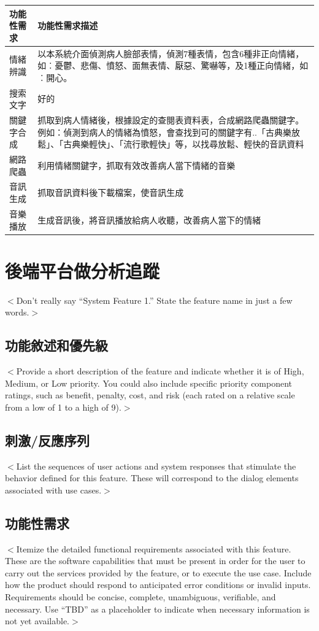 \documentclass[12pt]{scrreprt}
\begin{document}
\begin{center}  
\begin{tabular}{|l| p{10cm}|}  
\hline  
功能性需求 & 功能性需求描述   \\ \hline  
情緒辨識 &以本系統介面偵測病人臉部表情，偵測7種表情，包含6種非正向情緒，如︰憂鬱、悲傷、憤怒、面無表情、厭惡、驚嚇等，及1種正向情緒，如︰開心。    \\ \hline  
搜索文字& 好的\\\hline
關鍵字合成 & 抓取到病人情緒後，根據設定的查閱表資料表，合成網路爬蟲關鍵字。例如：偵測到病人的情緒為憤怒，會查找到可的關鍵字有..「古典樂放鬆」、「古典樂輕快」、「流行歌輕快」等，以找尋放鬆、輕快的音訊資料    \\ \hline  
網路爬蟲 & 利用情緒關鍵字，抓取有效改善病人當下情緒的音樂 \\ \hline
音訊生成 & 抓取音訊資料後下載檔案，使音訊生成 \\ \hline
音樂播放 & 生成音訊後，將音訊播放給病人收聽，改善病人當下的情緒 \\ \hline

\end{tabular}  
\end{center}  


\section{後端平台做分析追蹤}
$<$Don’t really say “System Feature 1.” State the feature name in just a few 
words.$>$

\subsection{功能敘述和優先級}
$<$Provide a short description of the feature and indicate whether it is of 
High, Medium, or Low priority. You could also include specific priority 
component ratings, such as benefit, penalty, cost, and risk (each rated on a 
relative scale from a low of 1 to a high of 9).$>$

\subsection{刺激/反應序列}
$<$List the sequences of user actions and system responses that stimulate the 
behavior defined for this feature. These will correspond to the dialog elements 
associated with use cases.$>$

\subsection{功能性需求}
$<$Itemize the detailed functional requirements associated with this feature.  
These are the software capabilities that must be present in order for the user 
to carry out the services provided by the feature, or to execute the use case.  
Include how the product should respond to anticipated error conditions or 
invalid inputs. Requirements should be concise, complete, unambiguous, 
verifiable, and necessary. Use “TBD” as a placeholder to indicate when necessary 
information is not yet available.$>$
\end{document}
